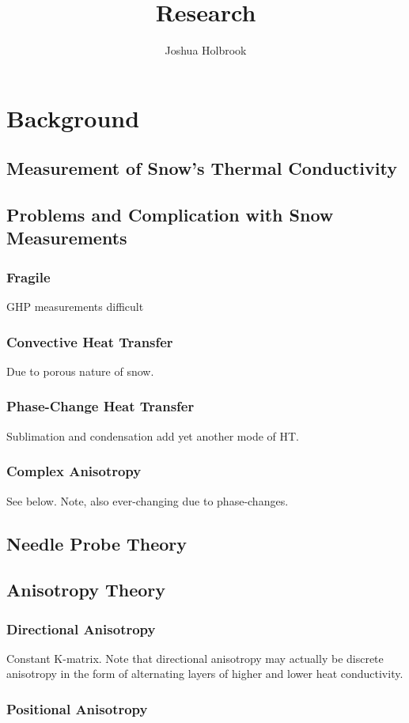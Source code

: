 \documentclass[10pt, letterpaper]{article}
\title{Research}
\author{Joshua Holbrook}
\begin{document}
    \section{Background}
      \subsection{Measurement of Snow's Thermal Conductivity}
      \subsection{Problems and Complication with Snow Measurements}
        \subsubsection{Fragile}
          GHP measurements difficult
        \subsubsection{Convective Heat Transfer}
          Due to porous nature of snow.
        \subsubsection{Phase-Change Heat Transfer}
          Sublimation and condensation add yet another mode of HT.
        \subsubsection{Complex Anisotropy}
          See below. Note, also ever-changing due to phase-changes.
      \subsection{Needle Probe Theory}
      \subsection{Anisotropy Theory}
        \subsubsection{Directional Anisotropy}
            Constant K-matrix. Note that directional anisotropy may actually be discrete anisotropy in the form of alternating layers of higher and lower heat conductivity.
        \subsubsection{Positional Anisotropy}
\end{document}
